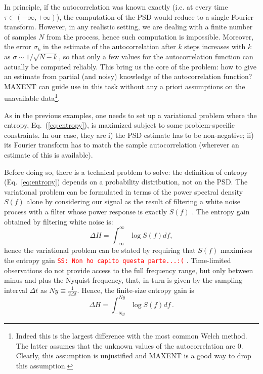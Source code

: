 \documentclass[twocolumn,showpacs,preprintnumbers,nofootinbib,prd,
superscriptaddress,10pt]{revtex4-1}
\newcommand{\sschmidt}[1]{{\textcolor{red}{\texttt{SS: #1}} }}
\begin{document}
In principle, if the autocorrelation was known exactly (i.e. at every time $\tau \in (-\infty,+\infty)$), the computation of the PSD 
would reduce to a single Fourier transform.
However, in any realistic setting, we are dealing with a finite number of samples $N$ from the process, hence such computation
is impossible.
Moreover, the error $\sigma_k$ in the estimate of the autocorrelation after $k$ steps increases with $k$ as $\sigma \sim 1/\sqrt{N - k}$, so that only a few values for the autocorrelation function can actually be computed reliably.
This bring us the core of the problem: how to give an estimate from partial (and noisy) knowledge of the autocorrelation function? MAXENT can guide use in this task without any a priori assumptions on the unavailable data\footnote{Indeed this is the largest difference with the most common Welch method. The latter assumes that the unknown values of the autocorrelation are $0$. Clearly, this assumption is unjustified and MAXENT is a good way to drop this assumption.}.
\par
As in the previous examples, one needs to set up a variational problem where the entropy, Eq.~(\ref{eq:entropy}), is maximized 
subject to some problem-specific constraints. 
In our case, they are i) the PSD estimate has to be non-negative; ii) its Fourier transform has to match the sample autocorrelation (wherever an estimate of this is available).
\par
Before doing so, there is a technical problem to solve: the definition of entropy (Eq.~\ref{eq:entropy}) depends on a probability distribution, 
not on the PSD. The variational problem can be formulated in terms of the power spectral density $S(f)$ alone by
considering our signal as the result of filtering a white noise process with a filter whose power response is exactly $S(f)$ \cite{AblesMESA}. 
The entropy gain obtained by filtering white noise is: 
\begin{equation}\label{eq:EntropyGain}
    \Delta H = \int_{-\infty}^{\infty}\log S(f) df , 
\end{equation}
hence the variational problem can be stated by requiring that $S(f)$ maximises the entropy gain \sschmidt{Non ho capito questa parte...:(}. 
Time-limited observations do not provide access to the full frequency range, but only between minus and plus the Nyquist frequency, 
that, in turn is given by the sampling interval $\Delta t$ as $Ny \equiv \frac{1}{2 \Delta t}$. Hence, the finite-size entropy
gain is 
\begin{equation}\label{eq:EntropyGain2}
    \Delta H = \int_{- Ny}^{Ny}\log S(f) df\,.
\end{equation}
\end{document}
